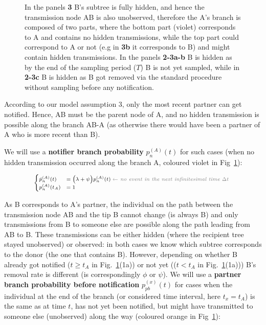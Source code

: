 \documentclass[10pt,letterpaper]{article}
\begin{document}
\begin{figure}[h!]
{In the panels \textbf{3} B's subtree is fully hidden, and hence the transmission node AB is also unobserved, therefore the A's branch is composed of two parts, where the bottom part (violet) corresponds to A and contains no hidden transmissions, while the top part could correspond to A or not  (e.g in \textbf{3b} it corresponds to B) and might contain hidden transmissions. 
In the panels \textbf{2-3a-b} B is hidden as by the end of the sampling period ($T$) B is not yet sampled, while in \textbf{2-3c} B is hidden as B got removed via the standard procedure without sampling before any notification.}
\label{fig:pn-branches} 
\end{figure}


According to our model assumption 3, only the most recent partner can get notified. Hence, AB must be the parent node of A, and no hidden transmission is possible along the branch AB-A (as otherwise there would have been a partner of A who is more recent than B).

We will use a \textbf{notifier branch probability} $p_n^{(A)}(t)$ for such cases (when no hidden transmission occurred along the branch A, coloured violet in Fig~\ref{fig:pn-branches}):

\begin{equation}
\scriptsize
\begin{cases}
\dot{p}_n^{(A)}(t) &=  \Big(\lambda + \psi\Big) p_n^{(A)}(t)\; \textit{\color{gray} $\leftarrow$ no event in the next infinitesimal time $\Delta t$ }\\
p_n^{(A)}(t_A) &= 1\label{eq:p-n}
\end{cases}
\end{equation}

As B corresponds to A's partner, the individual on the path between the transmission node AB and the tip B cannot change (is always B) and 
only transmissions from B to someone else are possible along the path leading from AB to B. These transmissions can be either hidden (where the recipient tree stayed unobserved) or observed: in both cases we know which subtree corresponds to the donor (the one that contains B). However, depending on whether B already got notified ($t \geq t_A$ in Fig.~\ref{fig:pn-branches}(1a)) or not yet (($t < t_A$ in Fig.~\ref{fig:pn-branches}(1a))) B's removal rate is different (is correspondingly $\phi$ or $\psi$). We will use a \textbf{partner branch probability before notification} $p_{pb}^{(x)}(t)$ for cases when the individual at the end of the branch (or considered time interval, here $t_x=t_A$) is the same as at time $t$, has not yet been notified, but might have transmitted to someone else (unobserved) along the way (coloured orange in Fig~\ref{fig:pn-branches}):
\end{document}
